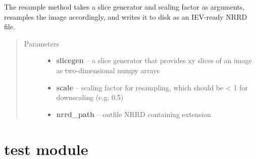 \documentclass[letterpaper,10pt,english]{sphinxmanual}
\begin{document}
\begin{fulllineitems}
\label{resampler:resampler.resample}
The resample method takes a slice generator and scaling factor as arguments, resamples the image accordingly,
and writes it to disk as an IEV-ready NRRD file.
\begin{quote}\begin{description}
\item[{Parameters}] \leavevmode\begin{itemize}
\item {} 
\textbf{slicegen} -- a slice generator that provides xy slices of an image as two-dimensional numpy arrays

\item {} 
\textbf{scale} -- scaling factor for resampling, which should be \textless{} 1 for downscaling (e.g. 0.5)

\item {} 
\textbf{nrrd\_path} -- outfile NRRD containing extension

\end{itemize}

\end{description}\end{quote}

\end{fulllineitems}



\chapter{test module}
\label{test:module-test}\label{test::doc}\label{test:test-module}
\end{document}
